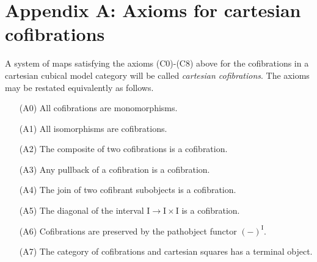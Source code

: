 \documentclass[11pt,reqno]{amsart}
\newcommand{\ra}{\ensuremath{\rightarrow}}
\newcommand{\I}{\ensuremath{\mathrm{I}}}
\theoremstyle{remark}
\theoremstyle{definition}
\begin{document}
\section*{Appendix A: Axioms for cartesian cofibrations}\label{appendixA:Cofibrations}

A system of maps satisfying the axioms (C0)-(C8) above for the cofibrations in a cartesian cubical model category will be called \emph{cartesian cofibrations}. The axioms may be restated equivalently as follows.
\begin{enumerate}
\item[(A0)] All cofibrations are monomorphisms.
\item[(A1)] All isomorphisms are cofibrations.
\item[(A2)] The composite of two cofibrations is a cofibration.
\item[(A3)] Any pullback of a cofibration is a cofibration.
\item[(A4)] The join of two cofibrant subobjects is a cofibration.
\item[(A5)] The diagonal of the interval $\I\ra\I\times\I$ is a cofibration.
\item[(A6)] Cofibrations are preserved by the pathobject functor $(-)^\I$.
\item[(A7)] The category of cofibrations and cartesian squares has a terminal object.
\end{enumerate}
\end{document}
